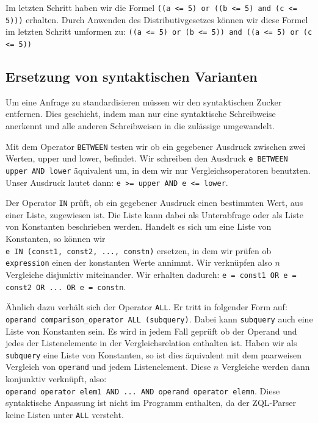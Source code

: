 Im letzten Schritt haben wir die Formel \verb|((a <= 5) or ((b <= 5) and (c <= 5)))| erhalten. Durch Anwenden des Distributivgesetzes können wir diese Formel im letzten Schritt umformen zu: \verb|((a <= 5) or (b <= 5)) and ((a <= 5) or (c <= 5))|

\subsection{Ersetzung von syntaktischen Varianten}

Um eine Anfrage zu standardisieren müssen wir den syntaktischen Zucker entfernen. Dies geschieht, indem man nur eine syntaktische Schreibweise anerkennt und alle anderen Schreibweisen in die zulässige umgewandelt. 

Mit dem Operator \verb|BETWEEN| testen wir ob ein gegebener Ausdruck zwischen zwei Werten, upper und lower, befindet. Wir schreiben den Ausdruck \verb|e BETWEEN upper AND lower| äquivalent um, in dem wir nur Vergleichsoperatoren benutzten. \\Unser Ausdruck lautet dann: \verb|e >= upper AND e <= lower|.

Der Operator \verb|IN| prüft, ob ein gegebener Ausdruck einen bestimmten Wert, aus einer Liste, zugewiesen ist. Die Liste kann dabei als Unterabfrage oder als Liste von Konstanten beschrieben werden. Handelt es sich um eine Liste von Konstanten, so können wir \\\verb|e IN (const1, const2, ..., constn)| ersetzen, in dem wir prüfen ob \verb|expression| einen der konstanten Werte annimmt. Wir verknüpfen also $n$ Vergleiche disjunktiv miteinander. Wir erhalten dadurch: \verb|e = const1 OR e = const2 OR ... OR e = constn|.

Ähnlich dazu verhält sich der Operator \verb|ALL|. Er tritt in folgender Form auf:\\
\verb|operand comparison_operator ALL (subquery)|. Dabei kann \verb|subquery| auch eine Liste von Konstanten sein. Es wird in jedem Fall geprüft ob der Operand und jedes der Listenelemente in der Vergleichsrelation enthalten ist. Haben wir als \verb|subquery| eine Liste von Konstanten, so ist dies äquivalent mit dem paarweisen Vergleich von \verb|operand| und jedem Listenelement. Diese $n$ Vergleiche werden dann konjunktiv verknüpft, also: \\
\verb|operand operator elem1 AND ... AND operand operator elemn|. 
Diese syntaktische Anpassung ist nicht im Programm enthalten, da der ZQL-Parser keine Listen unter \verb|ALL| versteht.

